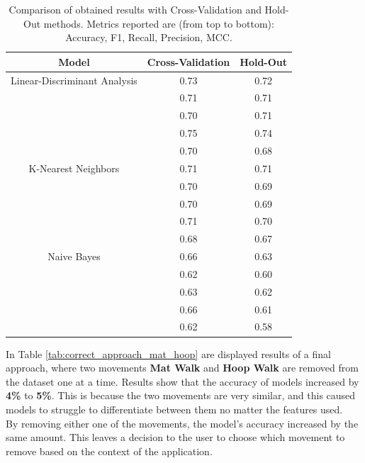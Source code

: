                 \begin{table}[htbp]
                    \centering
                    \caption{Comparison of obtained results with Cross-Validation and Hold-Out methods. Metrics reported are (from top to bottom): Accuracy, F1, Recall, Precision, MCC.}
                    \label{tab:correct_approach_cv}
                    \begin{tabular}{|c|c|c|}
                    \hline
                    \textbf{Model} & \textbf{Cross-Validation} & \textbf{Hold-Out} \\ \hline
                        Linear-Discriminant Analysis    & 0.73 & 0.72 \\ 
                                                        & 0.71 & 0.71 \\ 
                                                        & 0.70 & 0.71 \\ 
                                                        & 0.75 & 0.74 \\
                                                        & 0.70 & 0.68 \\ 
                                                        \hline
                        K-Nearest Neighbors             & 0.71 & 0.71 \\ 
                                                        & 0.70 & 0.69 \\ 
                                                        & 0.70 & 0.69 \\ 
                                                        & 0.71 & 0.70 \\
                                                        & 0.68 & 0.67 \\
                                                        \hline
                        Naive Bayes                     & 0.66 & 0.63 \\ 
                                                        & 0.62 & 0.60 \\ 
                                                        & 0.63 & 0.62 \\
                                                        & 0.66 & 0.61 \\ 
                                                        & 0.62 & 0.58 \\ 
                                                        \hline
                    \end{tabular}
                \end{table}
                \newpage
                In Table \ref{tab:correct_approach_mat_hoop} are displayed results of a final approach, where two movements \textbf{Mat Walk} and \textbf{Hoop Walk} are removed from the dataset one at a time. Results show that the accuracy of models increased by \textbf{4\%} to \textbf{5\%}. This is because the two movements are very similar, and this caused models to struggle to differentiate between them no matter the features used. \\
                By removing either one of the movements, the model's accuracy increased by the same amount. This leaves a decision to the user to choose which movement to remove based on the context of the application. 

